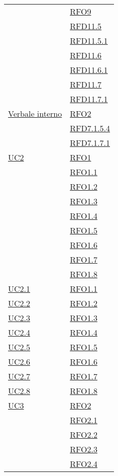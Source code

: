 \begin{longtable}{|>{\centering}m{5cm}|m{5cm}<{\centering}|}
& \hyperlink{RFO9}{RFO9}\\
& \hyperlink{RFD11.5}{RFD11.5}\\
& \hyperlink{RFD11.5.1}{RFD11.5.1}\\
& \hyperlink{RFD11.6}{RFD11.6}\\
& \hyperlink{RFD11.6.1}{RFD11.6.1}\\
& \hyperlink{RFD11.7}{RFD11.7}\\
& \hyperlink{RFD11.7.1}{RFD11.7.1}\\ \hline
\hyperlink{Verbale interno}{Verbale interno} & \hyperlink{RFO2}{RFO2}\\
& \hyperlink{RFD7.1.5.4}{RFD7.1.5.4}\\
& \hyperlink{RFD7.1.7.1}{RFD7.1.7.1}\\ \hline
\hyperref[UC2]{UC2} & \hyperlink{RFO1}{RFO1}\\
& \hyperlink{RFO1.1}{RFO1.1}\\
& \hyperlink{RFO1.2}{RFO1.2}\\
& \hyperlink{RFO1.3}{RFO1.3}\\
& \hyperlink{RFO1.4}{RFO1.4}\\
& \hyperlink{RFO1.5}{RFO1.5}\\
& \hyperlink{RFO1.6}{RFO1.6}\\
& \hyperlink{RFO1.7}{RFO1.7}\\
& \hyperlink{RFO1.8}{RFO1.8}\\ \hline
\hyperref[UC2.1]{UC2.1} & \hyperlink{RFO1.1}{RFO1.1}\\ \hline
\hyperref[UC2.2]{UC2.2} & \hyperlink{RFO1.2}{RFO1.2}\\ \hline
\hyperref[UC2.3]{UC2.3} & \hyperlink{RFO1.3}{RFO1.3}\\ \hline
\hyperref[UC2.4]{UC2.4} & \hyperlink{RFO1.4}{RFO1.4}\\ \hline
\hyperref[UC2.5]{UC2.5} & \hyperlink{RFO1.5}{RFO1.5}\\ \hline
\hyperref[UC2.6]{UC2.6} & \hyperlink{RFO1.6}{RFO1.6}\\ \hline
\hyperref[UC2.7]{UC2.7} & \hyperlink{RFO1.7}{RFO1.7}\\ \hline
\hyperref[UC2.8]{UC2.8} & \hyperlink{RFO1.8}{RFO1.8}\\ \hline
\hyperref[UC3]{UC3} & \hyperlink{RFO2}{RFO2}\\
& \hyperlink{RFO2.1}{RFO2.1}\\
& \hyperlink{RFO2.2}{RFO2.2}\\
& \hyperlink{RFO2.3}{RFO2.3}\\
& \hyperlink{RFO2.4}{RFO2.4}\\ \hline

\end{longtable}
